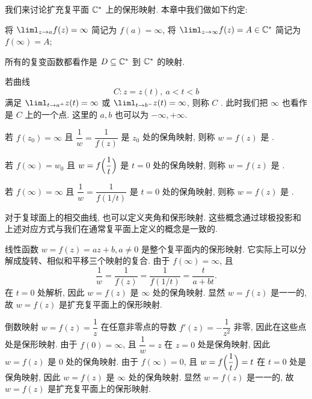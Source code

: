 我们来讨论扩充复平面 ${\mathbb{C}}^*$ 上的保形映射.
本章中我们做如下约定:
  \begin{enuma}
    \item 将 $\liml_{z\ra a}f(z)=\infty$ 简记为 $f(a)=\infty$, 将 $\liml_{z\ra \infty}f(z)=A\in\BC^*$ 简记为 $f(\infty)=A$;
    \item 所有的复变函数都看作是 $D\subseteq{\mathbb{C}}^*$ 到 ${\mathbb{C}}^*$ 的映射.
  \end{enuma}

若曲线
\[
  C: z=z(t),\ a<t<b
\]
满足 $\liml_{t\ra a^+}z(t)=\infty$ 或 $\liml_{t\ra b^-}z(t)=\infty$, 则称 $C$ .
此时我们把 $\infty$ 也看作是 $C$ 上的一个点.
这里的 $a,b$ 也可以为 $-\infty,+\infty$.

\begin{definition}
  \begin{enuma}
    \item 若 $f(z_0)=\infty$ 且 $\dfrac1w=\dfrac1{f(z)}$ 是 $z_0$ 处的保角映射, 则称 $w=f(z)$ 是 .
    \item 若 $f(\infty)=w_0$ 且 $w=f\Bigl(\dfrac1t\Bigr)$ 是 $t=0$ 处的保角映射, 则称 $w=f(z)$ 是 .
    \item 若 $f(\infty)=\infty$ 且 $\dfrac1w=\dfrac1{f(1/t)}$ 是 $t=0$ 处的保角映射, 则称 $w=f(z)$ 是 .
  \end{enuma}
\end{definition}

对于复球面上的相交曲线, 也可以定义夹角和保形映射.
这些概念通过球极投影和上述对应方式与我们在通常复平面上定义的概念是一致的.

\begin{example}
  \label{exam:linear-transform}
  线性函数 $w=f(z)=az+b,a\neq 0$ 是整个复平面内的保形映射.
  它实际上可以分解成旋转、相似和平移三个映射的复合.
  由于 $f(\infty)=\infty$, 且
  \[
    \dfrac1w=\dfrac1{f(z)}=\dfrac1{f(1/t)}=\dfrac{t}{a+bt}.
  \]
  在 $t=0$ 处解析, 因此 $w=f(z)$ 是 $\infty$ 处的保角映射.
  显然 $w=f(z)$ 是一一的, 故 $w=f(z)$ 是扩充复平面上的保形映射.
\end{example}

\begin{example}
  \label{exam:inverse-transform}
  倒数映射 $w=f(z)=\dfrac1z$ 在任意非零点的导数 $f'(z)=-\dfrac1{z^2}$ 非零, 因此在这些点处是保形映射.
  由于 $f(0)=\infty$, 且 $\dfrac1w=z$ 在 $z=0$ 处是保角映射, 因此 $w=f(z)$ 是 $0$ 处的保角映射.
  由于 $f(\infty)=0$, 且 $w=f\Bigl(\dfrac1t\Bigr)=t$ 在 $t=0$ 处是保角映射, 因此 $w=f(z)$ 是 $\infty$ 处的保角映射.
  显然 $w=f(z)$ 是一一的, 故 $w=f(z)$ 是扩充复平面上的保形映射.
\end{example}

